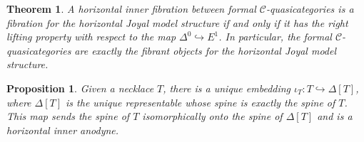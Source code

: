 \documentclass[leqno]{article}
\numberwithin{equation}{subsection}
\theoremstyle{plain}   %
\newtheorem{thm}[equation]{Theorem}
\newtheorem{prop}[equation]{Proposition}
\theoremstyle{remark}
\theoremstyle{plain}
\newcommand{\C}{\ensuremath{\mathcal{C}}}
\begin{document}
\begin{thm}\label{isofibrations}
	A horizontal inner fibration between formal \(\C\)-quasicategories is a fibration for the horizontal Joyal model structure if and only if it has the right lifting property with respect to the map \(\Delta^0\hookrightarrow E^1\).  In particular, the formal \(\C\)-quasicategories are exactly the fibrant objects for the horizontal Joyal model structure.
\end{thm}

\begin{prop}
	Given a necklace \(T\), there is a unique embedding \(\iota_T:T\hookrightarrow \Delta[T]\), where \(\Delta[T]\) is the unique representable whose spine is exactly the spine of \(T\).  This map sends the spine of \(T\) isomorphically onto the spine of \(\Delta[T]\) and is a horizontal inner anodyne.
\end{prop}
\end{document}
